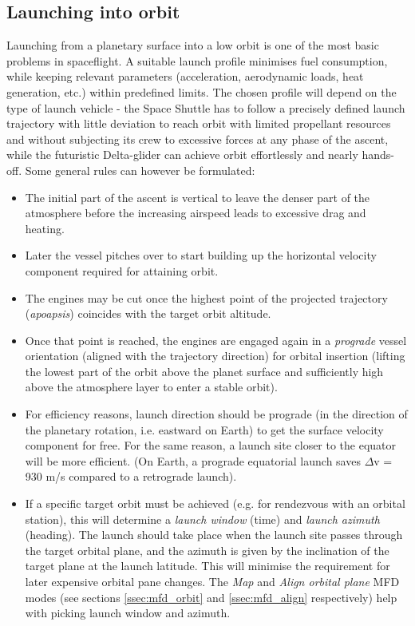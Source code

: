 \documentclass[Orbiter User Manual.tex]{subfiles}
\begin{document}
\subsection{Launching into orbit}
\label{ssec:basic_launch}
Launching from a planetary surface into a low orbit is one of the most basic problems in spaceflight. A suitable launch profile minimises fuel consumption, while keeping relevant parameters (acceleration, aerodynamic loads, heat generation, etc.) within predefined limits. The chosen profile will depend on the type of launch vehicle - the Space Shuttle has to follow a precisely defined launch trajectory with little deviation to reach orbit with limited propellant resources and without subjecting its crew to excessive forces at any phase of the ascent, while the futuristic Delta-glider can achieve orbit effortlessly and nearly hands-off. Some general rules can however be formulated:

\begin{itemize}
\item The initial part of the ascent is vertical to leave the denser part of the atmosphere before the increasing airspeed leads to excessive drag and heating.
\item Later the vessel pitches over to start building up the horizontal velocity component required for attaining orbit.
\item The engines may be cut once the highest point of the projected trajectory (\textit{apoapsis}) coincides with the target orbit altitude.
\item Once that point is reached, the engines are engaged again in a \textit{prograde} vessel orientation (aligned with the trajectory direction) for orbital insertion (lifting the lowest part of the orbit above the planet surface and sufficiently high above the atmosphere layer to enter a stable orbit).
\item For efficiency reasons, launch direction should be prograde (in the direction of the planetary rotation, i.e. eastward on Earth) to get the surface velocity component for free. For the same reason, a launch site closer to the equator will be more efficient. (On Earth, a prograde equatorial launch saves $\Delta$v = 930 m/s compared to a retrograde launch).
\item If a specific target orbit must be achieved (e.g. for rendezvous with an orbital station), this will determine a \textit{launch window} (time) and \textit{launch azimuth} (heading). The launch should take place when the launch site passes through the target orbital plane, and the azimuth is given by the inclination of the target plane at the launch latitude. This will minimise the requirement for later expensive orbital pane changes. The \textit{Map} and \textit{Align orbital plane} MFD modes (see sections \ref{ssec:mfd_orbit} and \ref{ssec:mfd_align} respectively) help with picking launch window and azimuth.
\end{itemize}
\end{document}
